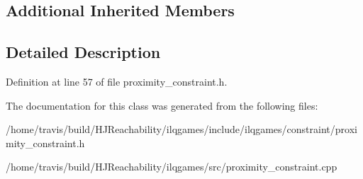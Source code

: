 \subsection*{Additional Inherited Members}


\subsection{Detailed Description}


Definition at line 57 of file proximity\+\_\+constraint.\+h.



The documentation for this class was generated from the following files\+:\begin{DoxyCompactItemize}
\item 
/home/travis/build/\+H\+J\+Reachability/ilqgames/include/ilqgames/constraint/proximity\+\_\+constraint.\+h\item 
/home/travis/build/\+H\+J\+Reachability/ilqgames/src/proximity\+\_\+constraint.\+cpp\end{DoxyCompactItemize}
